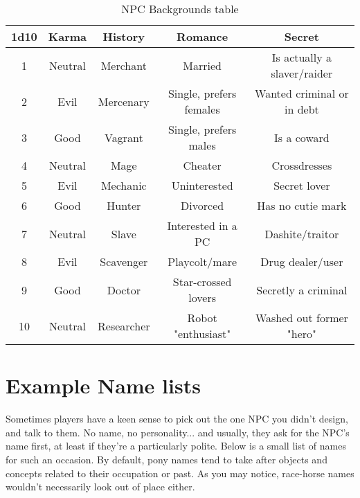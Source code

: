 \documentclass[11pt,a4paper,twocolumn]{book}
\begin{document}
     \begin{table*}[t]
        \centering
        \caption{NPC Backgrounds table}
        \begin{tabular}{|c|c|c|c|c|}
           \hline
           \textbf{1d10}    & \textbf{Karma}    & \textbf{History}  & \textbf{Romance}          & \textbf{Secret}  \\ \hline
                    1       &  Neutral          &  Merchant         & Married                   & Is actually a slaver/raider \\
                    2       &  Evil             &  Mercenary        & Single, prefers females   & Wanted criminal or in debt   \\
                    3       &  Good             &  Vagrant          & Single, prefers males     & Is a coward    \\
                    4       &  Neutral          &  Mage             & Cheater                   & Crossdresses     \\
                    5       &  Evil             &  Mechanic         & Uninterested              & Secret lover      \\
                    6       &  Good             &  Hunter           & Divorced                  & Has no cutie mark     \\
                    7       &  Neutral          &  Slave            & Interested in a PC        & Dashite/traitor      \\
                    8       &  Evil             &  Scavenger        & Playcolt/mare             & Drug dealer/user      \\
                    9       &  Good             &  Doctor           & Star-crossed lovers       & Secretly a criminal     \\
                    10      &  Neutral          &  Researcher       & Robot "enthusiast"        & Washed out former "hero"     \\ \hline
        \end{tabular}
        \label{tab:my_label}
    \end{table*}
    

    
    
   \section*{Example Name lists}
   
   Sometimes players have a keen sense to pick out the one NPC you didn't design, and talk to them. No name, no personality... and usually, they ask for the NPC's name first, at least if they're a particularly polite. Below is a small list of names for such an occasion. By default, pony names tend to take after objects and concepts related to their occupation or past. As you may notice, race-horse names wouldn't necessarily look out of place either.
   
\end{document}

